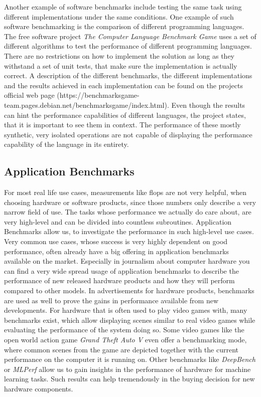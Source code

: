 Another example of software benchmarks include testing the same task using
different implementations under the same conditions.  One example of such
software benchmarking is the comparison of different programming languages. The
free software project \emph{The Computer Language Benchmark Game} uses a set of
different algorithms to test the performance of different programming languages.
There are no restrictions on how to implement the solution as long as they
withstand a set of unit tests, that make sure the implementation is actually
correct. A description of the different benchmarks, the different
implementations and the results achieved in each implementation can be found on
the projects official web page
(https://benchmarksgame-team.pages.debian.net/benchmarksgame/index.html). Even
though the results can hint the performance capabilities of different languages,
the project states, that it is important to see them in context. The performance
of these mostly synthetic, very isolated operations are not capable of
displaying the performance capability of the language in its entirety.
\cite{CompLangBenchmGame}



\subsection{Application Benchmarks}

For most real life use cases, measurements like \gls{flops} are not very
helpful, when choosing hardware or software products, since those numbers only
describe a very narrow field of use. The tasks whose performance we actually do
care about, are very high-level and can be divided into countless subroutines.
Application Benchmarks allow us, to investigate the performance in such
high-level use cases. Very common use cases, whose success is very highly
dependent on good performance, often already have a big offering in application
benchmarks available on the market. Especially in journalism about computer
hardware you can find a very wide spread usage of application benchmarks to
describe the performance of new released hardware products and how they will
perform compared to other models. In advertisements for hardware products,
benchmarks are used as well to prove the gains in performance available from new
developments. For hardware that is often used to play video games with, many
benchmarks exist, which allow displaying scenes similar to real video games
while evaluating the performance of the system doing so. Some video games like
the open world action game \emph{Grand Theft Auto V} even offer a benchmarking
mode, where common scenes from the game are depicted together with the current
performance on the computer it is running on. Other benchmarks like
\emph{DeepBench} or \emph{MLPerf} allow us to gain insights in the performance
of hardware for machine learning tasks. Such results can help tremendously in
the buying decision for new hardware components. 
\cite{ApplicationBenchmark, Gta5Bench}


